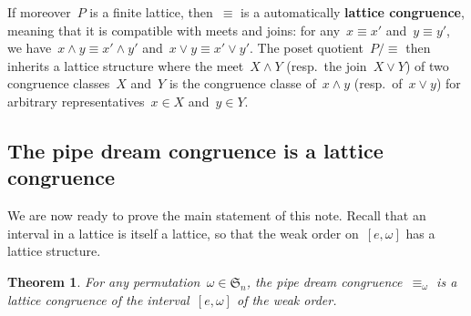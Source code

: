 \documentclass{amsart}
\newtheorem{theorem}{Theorem}%
\theoremstyle{definition}
\newcommand{\defn}[1]{\textbf{\textsf{\color{PineGreen} #1}}} %
\newcommand{\fS}{\mathfrak{S}} %
\newcommand{\meet}{\wedge} %
\newcommand{\join}{\vee} %
\begin{document}
If moreover~$P$ is a finite lattice, then~$\equiv$ is a automatically \defn{lattice congruence}, meaning that it is compatible with meets and joins: for any~$x \equiv x'$ and~$y \equiv y'$, we have~$x \meet y \equiv x' \meet y'$ and~$x \join y \equiv x' \join y'$. The poset quotient~$P/{\equiv}$ then inherits a lattice structure where the meet~$X \meet Y$ (resp.~the join~$X \join Y$) of two congruence classes~$X$ and~$Y$ is the congruence classe of~$x \meet y$ (resp.~of~$x \join y$) for arbitrary representatives~$x \in X$ and~$y \in Y$.



\subsection{The pipe dream congruence is a lattice congruence}
\label{subsec:proofCongruence}

We are now ready to prove the main statement of this note. Recall that an interval in a lattice is itself a lattice, so that the weak order on~$[e,\omega]$ has a lattice structure.

\begin{theorem}
For any permutation~$\omega \in \fS_n$, the pipe dream congruence~$\equiv_\omega$ is a lattice congruence of the interval~$[e,\omega]$ of the weak order.
\end{theorem}
\end{document}
